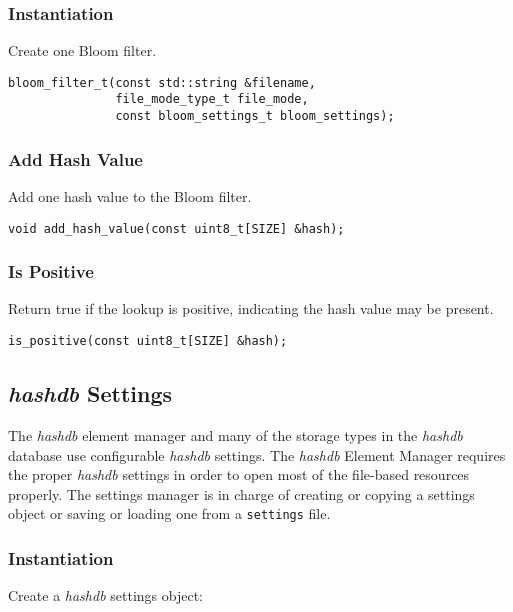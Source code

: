 \documentclass[12pt,twoside]{article}
\newcommand{\hdb}{\emph{hashdb}\xspace}
\begin{document}
\subsubsection{Instantiation}
Create one Bloom filter.
\begin{small}
\begin{verbatim}
bloom_filter_t(const std::string &filename,
               file_mode_type_t file_mode,
               const bloom_settings_t bloom_settings);
\end{verbatim}
\end{small}

\subsubsection{Add Hash Value}
Add one hash value to the Bloom filter.
\begin{small}
\begin{verbatim}
void add_hash_value(const uint8_t[SIZE] &hash);
\end{verbatim}
\end{small}

\subsubsection{Is Positive}
Return true if the lookup is positive, indicating the hash value may be present.
\begin{small}
\begin{verbatim}
is_positive(const uint8_t[SIZE] &hash);
\end{verbatim}
\end{small}


\subsection{\hdb Settings}
The \hdb element manager and
many of the storage types in the \hdb database use configurable \hdb settings.
The \hdb Element Manager requires the proper \hdb settings
in order to open most of the file-based resources properly.
The settings manager is in charge of creating or copying a settings object
or saving or loading one from a \texttt{settings} file.

\subsubsection{Instantiation}
Create a \hdb settings object:
\end{document}
